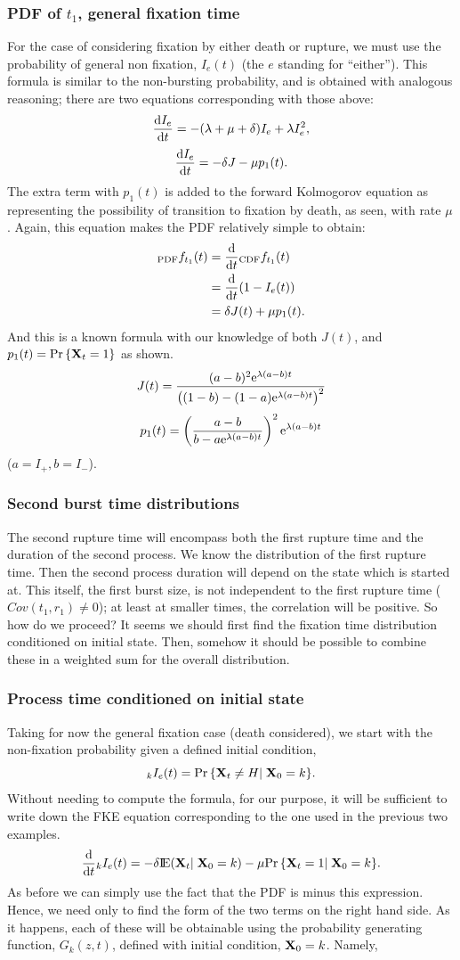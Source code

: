 \subsubsection*{PDF of $t_1$, general fixation time}
For the case of considering fixation by either death or rupture, we must use the probability of general non fixation, $I_e(t)$ (the $e$ standing for ``either''). This formula is similar to the non-bursting probability, and is obtained with analogous reasoning; there are two equations corresponding with those above:
$$\displaystyle\frac{{\rm d} I_e}{{\rm d} t} = - (\lambda+\mu+\delta) I_e + \lambda I_e^2,$$
$$\displaystyle\frac{{\rm d} I_e}{{\rm d} t} = -\delta J - \mu p_1(t).$$
The extra term with $p_1(t)$ is added to the forward Kolmogorov equation as representing the possibility of transition to fixation by death, as seen, with rate $\mu$. Again, this equation makes the PDF relatively simple to obtain: 
\begin{align*}
_{\text{PDF}}f_{ t_1}(t) &= \displaystyle\frac{{\rm d} }{{\rm d} t}{ _{\text{CDF}}f_{ t_1}(t)}\\
&=\displaystyle\frac{{\rm d} }{{\rm d} t} (1-I_e(t))\\
&= \delta J(t) + \mu p_1(t).
\end{align*}
And this is a known formula with our knowledge of both $J(t)$, and $p_1(t) = {\text{Pr}\left\{{{\bf X}_t} = 1\right\}}$ as shown.
$$J(t) = \frac{(a-b)^2{\rm e}^{\lambda(a-b)t}}{\left((1-b) - (1-a){\rm e}^{\lambda(a-b)t}\right)^2} $$
$$p_1(t) = \left(\frac{a-b}{b - a {\rm e}^{\lambda(a-b)t}}\right)^2 {\rm e}^{\lambda(a-b)t}$$
($a = I_+, b = I_-$).

\subsubsection*{Second burst time distributions}
The second rupture time will encompass both the first rupture time and the duration of the second process. We know the distribution of the first rupture time. Then the second process duration will depend on the state which is started at. This itself, the first burst size, is not independent to the first rupture time ($Cov(t_1, r_1) \neq 0$); at least at smaller times, the correlation will be positive. So how do we proceed? It seems we should first find the fixation time distribution conditioned on initial state. Then, somehow it should be possible to combine these in a weighted sum for the overall distribution.

\subsubsection*{Process time conditioned on initial state} 
Taking for now the general fixation case (death considered), we start with the non-fixation probability given a defined initial condition,
$$_kI_e(t) = {\text{Pr}\left\{{{\bf X}_t} \neq H |\; {\bf X}_0 = k\right\}}.$$
Without needing to compute the formula, for our purpose, it will be sufficient to write down the FKE equation corresponding to the one used in the previous two examples.  
$$\displaystyle\frac{{\rm d} }{{\rm d} t}{_kI_e(t)} =  -\delta {\rm I}\!{\rm E}({{\bf X}_t}|\;{\bf X}_0 = k) - \mu {\text{Pr}\left\{{{\bf X}_t}= 1|\;{\bf X}_0 = k\right\}}.$$
As before we can simply use the fact that the PDF is minus this expression. Hence, we need only to find the form of the two terms on the right hand side. As it happens, each of these will be obtainable using the probability generating function, $G_k(z,t)$, defined with initial condition, ${\bf X}_0 = k$. Namely,

